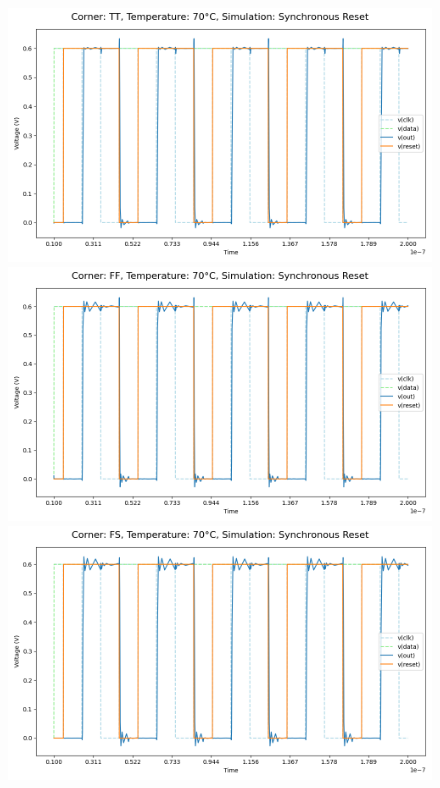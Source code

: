 \begin{figure}[H]
    \centering
    \includegraphics[height= 0.21\textheight]{figures/aimspice/0.600_0.1u_0.1u_0.3u_0.1u/functionality/TT70W3.png}
    \vspace{5pt}
    \includegraphics[height= 0.21\textheight]{figures/aimspice/0.600_0.1u_0.1u_0.3u_0.1u/functionality/FF70W3.png}
    \vspace{5pt}
    \includegraphics[height= 0.21\textheight]{figures/aimspice/0.600_0.1u_0.1u_0.3u_0.1u/functionality/FS70W3.png}

\end{figure}
